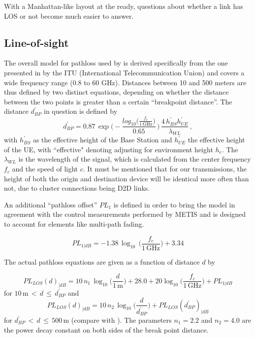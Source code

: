 With a Manhattan-like layout at the ready, questions about whether a link has LOS or not become much easier to answer.

\subsection{Line-of-sight} \label{LOS}
The overall model for pathloss used by \cite{Raschkowski} is derived specifically from the one presented in \cite{ReportITU-RM.2135-12009} by the ITU (International Telecommunication Union) and covers a wide frequency range (0.8 to 60 GHz). Distances between 10 and 500 meters are thus defined by two distinct equations, depending on whether the distance between the two points is greater than a certain ``breakpoint distance''. The distance $d^\prime_{BP}$ in question is defined by
\begin{equation} \label{eq:dbp}
d^\prime_{BP} = 0.87\, \exp\bigg( -\frac {log_{10} \big( \frac {f_c} {1\,\text{GHz}} \big)} {0.65} \,\bigg)\,\frac{4\,h^\prime_{BS}h^\prime_{UE}}{\lambda_{WL}}\,,
\end{equation}
with $h^\prime_{BS}$ as the effective height of the Base Station and $h^\prime_{UE}$ the effective height of the UE, with ``effective" denoting adjusting for environment height $h_e$. The $\lambda_{WL}$ is the wavelength of the signal, which is calculated from the center frequency $f_c$ and the speed of light $c$. It must be mentioned that for our transmissions, the height of both the origin and destination device will be identical more often than not, due to cluster connections being D2D links.

An additional ``pathloss offset'' $PL_1$ is defined in order to bring the model in agreement with the control measurements performed by METIS and is designed to account for elements like multi-path fading.

\begin{equation} \label{eq:PL_1}
PL_{1|dB} = -1.38\,\log_{10}\,\bigg( \frac {f_c}{1\,\text{GHz}} \bigg) + 3.34
\end{equation}


The actual pathloss equations are given as a function of distance $d$ by

\begin{equation} \label{eq:PL_LOS_1}
  PL_{LOS}(d)_{|dB} = 10\,n_1\,\log_{10}\bigg( \frac{d}{1\,\text{m}} \bigg) + 28.0 + 20 \log_{10} \bigg( \frac{f_c}{1\,\text{GHz}} \bigg) + PL_{1|dB}
\end{equation}
for $10\,\text{m}\,<\,d\, \le \,d^\prime_{BP}$ and
\begin{equation} \label{eq:PL_LOS_2}
  PL_{LOS}(d)_{|dB} = 10\,n_2\,\log_{10}\bigg( \frac{d}{d^\prime_{BP}} \bigg) + PL_{LOS}(d^\prime_{BP})_{|dB}
\end{equation}
for $d^\prime_{BP}\,<\,d\, \le \,500\,\text{m}$ (compare with \cite{Raschkowski}). The parameters $n_1 = 2.2$ and $n_2 = 4.0$ are the power decay constant on both sides of the break point distance.

